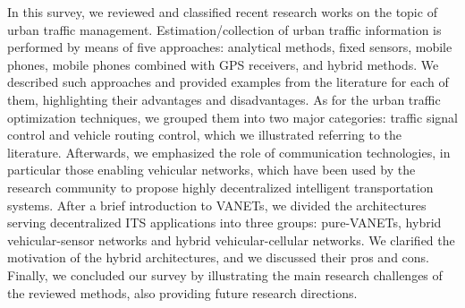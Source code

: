 \documentclass[10pt,onecolumn]{article}
\begin{document}
In this survey, we reviewed and classified recent research works on the topic of urban traffic management. 
Estimation/collection of urban traffic information is performed by means of five approaches: analytical methods, fixed sensors, mobile phones, mobile phones combined with GPS receivers, and hybrid methods.
We described such approaches and provided examples from the literature for each of them, highlighting their advantages and disadvantages.
As for the urban traffic optimization techniques, we grouped them into two major categories: traffic signal control and vehicle routing control,
which we illustrated referring to the literature.  
Afterwards, we emphasized the role of communication technologies, in particular those enabling vehicular networks, which have been used by the research community to propose highly decentralized intelligent transportation systems.
After a brief introduction to VANETs, we divided the architectures serving decentralized ITS applications into three groups: pure-VANETs, hybrid vehicular-sensor networks and hybrid vehicular-cellular networks. We clarified the motivation of the hybrid architectures, and we discussed their pros and cons. 
Finally, we concluded our survey by illustrating the main research challenges of the reviewed methods, also providing future research directions.
\end{document}
